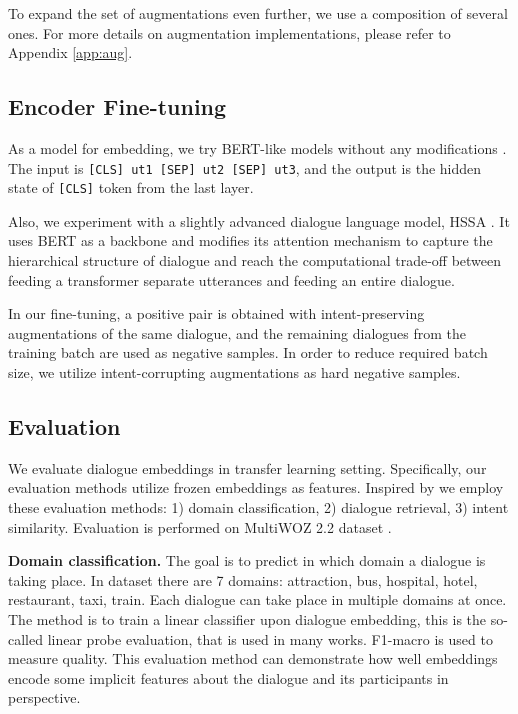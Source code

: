 \documentclass{article}
\begin{document}
To expand the set of augmentations even further, we use a composition of several ones. For more details on augmentation implementations, please refer to Appendix \ref{app:aug}.

\subsection{Encoder Fine-tuning}

As a model for embedding, we try BERT-like models without any modifications \cite{devlin2019bert}. The input is \texttt{[CLS] ut1 [SEP] ut2 [SEP] ut3}, and the output is the hidden state of \texttt{[CLS]} token from the last layer. 

Also, we experiment with a slightly advanced dialogue language model, HSSA \cite{zhang-etal-2023-dialog}. It uses BERT as a backbone and modifies its attention mechanism to capture the hierarchical structure of dialogue and reach the computational trade-off between feeding a transformer separate utterances and feeding an entire dialogue.

In our fine-tuning, a positive pair is obtained with intent-preserving augmentations of the same dialogue, and the remaining dialogues from the training batch are used as negative samples. In order to reduce required batch size, we utilize intent-corrupting augmentations as hard negative samples.

\subsection{Evaluation} \label{sec:evaluation}

We evaluate dialogue embeddings in transfer learning setting. Specifically, our evaluation methods utilize frozen embeddings as features. Inspired by \cite{liu2022dial2vec} we employ these evaluation methods: 1) domain classification, 2) dialogue retrieval, 3) intent similarity. Evaluation is performed on MultiWOZ 2.2 dataset \cite{zang2020multiwoz}.

\textbf{Domain classification.} The goal is to predict in which domain a dialogue is taking place. In dataset there are 7 domains: attraction, bus, hospital, hotel, restaurant, taxi, train. Each dialogue can take place in multiple domains at once. The method is to train a linear classifier upon dialogue embedding, this is the so-called linear probe evaluation, that is used in many works. F1-macro is used to measure quality. This evaluation method can demonstrate how well embeddings encode some implicit features about the dialogue and its participants in perspective.
\end{document}
